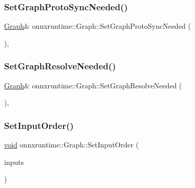 \subsubsection{\texorpdfstring{Set\+Graph\+Proto\+Sync\+Needed()}{SetGraphProtoSyncNeeded()}}
{\footnotesize\ttfamily \mbox{\hyperlink{classonnxruntime_1_1Graph}{Graph}}\& onnxruntime\+::\+Graph\+::\+Set\+Graph\+Proto\+Sync\+Needed (\begin{DoxyParamCaption}{ }\end{DoxyParamCaption})\hspace{0.3cm}{\ttfamily [inline]}, {\ttfamily [noexcept]}}

\mbox{\label{classonnxruntime_1_1Graph_abd668cfb112919d34b6260ebb2084742}} 
\subsubsection{\texorpdfstring{Set\+Graph\+Resolve\+Needed()}{SetGraphResolveNeeded()}}
{\footnotesize\ttfamily \mbox{\hyperlink{classonnxruntime_1_1Graph}{Graph}}\& onnxruntime\+::\+Graph\+::\+Set\+Graph\+Resolve\+Needed (\begin{DoxyParamCaption}{ }\end{DoxyParamCaption})\hspace{0.3cm}{\ttfamily [inline]}, {\ttfamily [noexcept]}}

\mbox{\label{classonnxruntime_1_1Graph_a9a56cb55cbbe5f19276cbc1ca26ec81d}} 
\subsubsection{\texorpdfstring{Set\+Input\+Order()}{SetInputOrder()}}
{\footnotesize\ttfamily \mbox{\hyperlink{mlasi_8h_a88f941d423cb2a819b70a1358982b1a6}{void}} onnxruntime\+::\+Graph\+::\+Set\+Input\+Order (\begin{DoxyParamCaption}\item[{const std\+::vector$<$ const \mbox{\hyperlink{classonnxruntime_1_1NodeArg}{Node\+Arg}} $\ast$$>$}]{inputs }\end{DoxyParamCaption})\hspace{0.3cm}{\ttfamily [inline]}}

